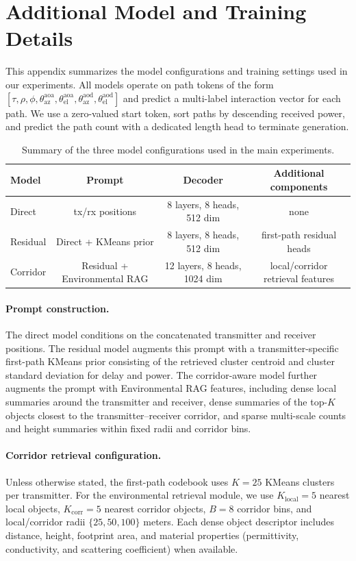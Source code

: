 \section{Additional Model and Training Details}
\label{appendix:model_training}

This appendix summarizes the model configurations and training settings used in our experiments. All models operate on path tokens of the form
\(
[\tau,\rho,\phi,\theta^{\mathrm{aoa}}_{\mathrm{az}},\theta^{\mathrm{aoa}}_{\mathrm{el}},\theta^{\mathrm{aod}}_{\mathrm{az}},\theta^{\mathrm{aod}}_{\mathrm{el}}]
\)
and predict a multi-label interaction vector for each path. We use a zero-valued start token, sort paths by descending received power, and predict the path count with a dedicated length head to terminate generation.

\begin{table}[h]
\centering
\caption{Summary of the three model configurations used in the main experiments.}
\label{tab:appendix_model_configs}
\small
\begin{tabular}{lccc}
\toprule
Model & Prompt & Decoder & Additional components \\
\midrule
Direct & tx/rx positions & 8 layers, 8 heads, 512 dim & none \\
Residual & Direct + KMeans prior & 8 layers, 8 heads, 512 dim & first-path residual heads \\
Corridor & Residual + Environmental RAG & 12 layers, 8 heads, 1024 dim & local/corridor retrieval features \\
\bottomrule
\end{tabular}
\end{table}

\paragraph{Prompt construction.}
The direct model conditions on the concatenated transmitter and receiver positions. The residual model augments this prompt with a transmitter-specific first-path KMeans prior consisting of the retrieved cluster centroid and cluster standard deviation for delay and power. The corridor-aware model further augments the prompt with Environmental RAG features, including dense local summaries around the transmitter and receiver, dense summaries of the top-$K$ objects closest to the transmitter--receiver corridor, and sparse multi-scale counts and height summaries within fixed radii and corridor bins.

\paragraph{Corridor retrieval configuration.}
Unless otherwise stated, the first-path codebook uses \(K=25\) KMeans clusters per transmitter. For the environmental retrieval module, we use \(K_{\mathrm{local}}=5\) nearest local objects, \(K_{\mathrm{corr}}=5\) nearest corridor objects, \(B=8\) corridor bins, and local/corridor radii \(\{25, 50, 100\}\) meters. Each dense object descriptor includes distance, height, footprint area, and material properties (permittivity, conductivity, and scattering coefficient) when available.

